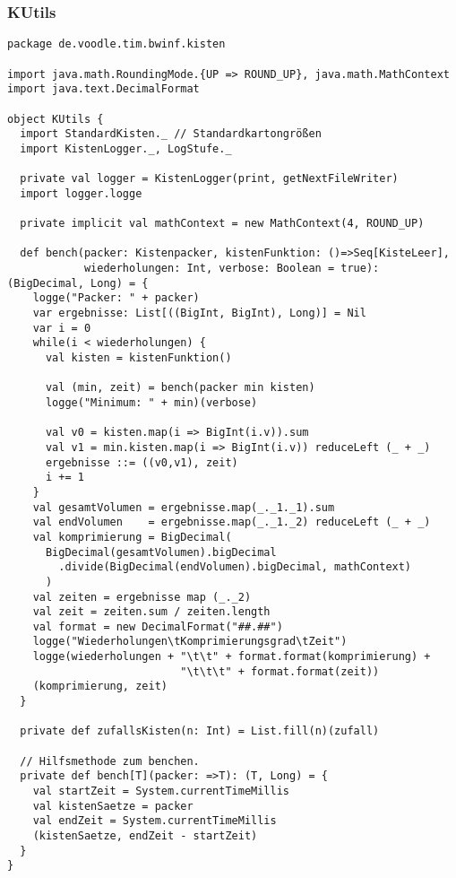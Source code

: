\subsubsection{KUtils}
\begin{lstlisting}
package de.voodle.tim.bwinf.kisten

import java.math.RoundingMode.{UP => ROUND_UP}, java.math.MathContext
import java.text.DecimalFormat

object KUtils {
  import StandardKisten._ // Standardkartongrößen
  import KistenLogger._, LogStufe._

  private val logger = KistenLogger(print, getNextFileWriter)
  import logger.logge

  private implicit val mathContext = new MathContext(4, ROUND_UP)

  def bench(packer: Kistenpacker, kistenFunktion: ()=>Seq[KisteLeer],
            wiederholungen: Int, verbose: Boolean = true): (BigDecimal, Long) = {
    logge("Packer: " + packer)
    var ergebnisse: List[((BigInt, BigInt), Long)] = Nil
    var i = 0
    while(i < wiederholungen) {
      val kisten = kistenFunktion()

      val (min, zeit) = bench(packer min kisten)
      logge("Minimum: " + min)(verbose)

      val v0 = kisten.map(i => BigInt(i.v)).sum
      val v1 = min.kisten.map(i => BigInt(i.v)) reduceLeft (_ + _)
      ergebnisse ::= ((v0,v1), zeit)
      i += 1
    }
    val gesamtVolumen = ergebnisse.map(_._1._1).sum
    val endVolumen    = ergebnisse.map(_._1._2) reduceLeft (_ + _)
    val komprimierung = BigDecimal(
      BigDecimal(gesamtVolumen).bigDecimal
        .divide(BigDecimal(endVolumen).bigDecimal, mathContext)
      )
    val zeiten = ergebnisse map (_._2)
    val zeit = zeiten.sum / zeiten.length
    val format = new DecimalFormat("##.##")
    logge("Wiederholungen\tKomprimierungsgrad\tZeit")
    logge(wiederholungen + "\t\t" + format.format(komprimierung) +
                           "\t\t\t" + format.format(zeit))
    (komprimierung, zeit)
  }

  private def zufallsKisten(n: Int) = List.fill(n)(zufall)

  // Hilfsmethode zum benchen.
  private def bench[T](packer: =>T): (T, Long) = {
    val startZeit = System.currentTimeMillis
    val kistenSaetze = packer
    val endZeit = System.currentTimeMillis
    (kistenSaetze, endZeit - startZeit)
  }
}
\end{lstlisting}
